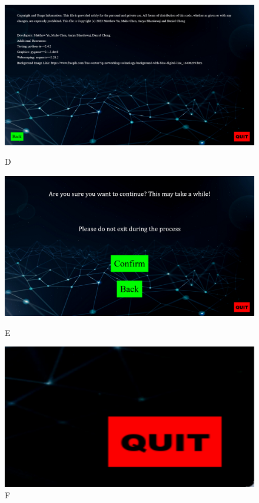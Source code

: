 \documentclass[fontsize=12pt]{article}
\begin{document}
\begin{figure}[!htb]
  \includegraphics[width=\linewidth]{img/d.png}
  \caption{D}\label{fig:awesome_image1}
\endminipage\hfill
{}
  \includegraphics[width=\linewidth]{img/e.png}
  \caption{E}\label{fig:awesome_image2}
\endminipage\hfill
{}%
  \includegraphics[width=\linewidth]{img/f.png}
  \caption{F}\label{fig:awesome_image3}
\endminipage
\end{figure}
\end{document}
